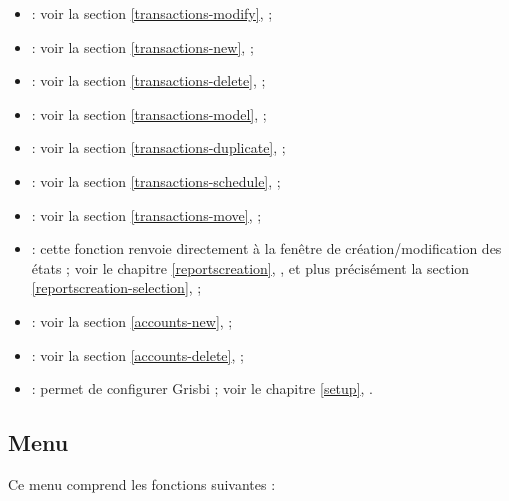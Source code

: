 \begin{itemize}
	\item {} : voir la section \vref{transactions-modify},  ;
	\item {} : voir la section \vref{transactions-new},  ;
	\item {} : voir la section \vref{transactions-delete},  ;
	\item {} : voir la section \vref{transactions-model},  ;
	\item {} : voir la section \vref{transactions-duplicate},  ;
	\item {} : voir la section \vref{transactions-schedule},  ;
	\item {} : voir la section \vref{transactions-move},  ;
	\item {} : cette fonction renvoie directement à la fenêtre de création/modification des états ; voir le chapitre \vref{reportscreation}, , et plus précisément la section \vref{reportscreation-selection},  ;
	\item {} : voir la section \vref{accounts-new},  ;
	\item {} : voir la section \vref{accounts-delete},  ;
	\item {} : permet de configurer Grisbi ; voir le chapitre \vref{setup}, .
\end{itemize}


\subsection{Menu \label{home-menus-display}}

Ce menu comprend les fonctions suivantes : 

